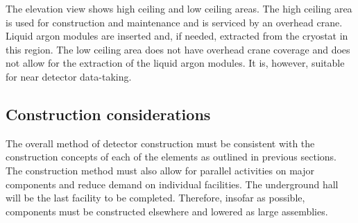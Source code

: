 The elevation view shows high ceiling and low ceiling areas. The high ceiling area is used for  construction and maintenance and is serviced by an overhead crane. Liquid argon modules are inserted and, if needed, extracted from the cryostat in this region.  The low ceiling area does not have overhead crane coverage and does not allow for the extraction of the liquid argon modules.  It is, however, suitable for near detector data-taking.  




\subsection{Construction considerations}
\label{ssec:NDconstruction}

The overall method of detector construction must be consistent with the construction concepts of each of the elements as outlined in previous sections. The construction method must also allow for parallel activities on major components and reduce demand on individual facilities. The underground hall will be the last facility to be completed. Therefore, insofar as possible, components must be constructed elsewhere and lowered as large assemblies.

